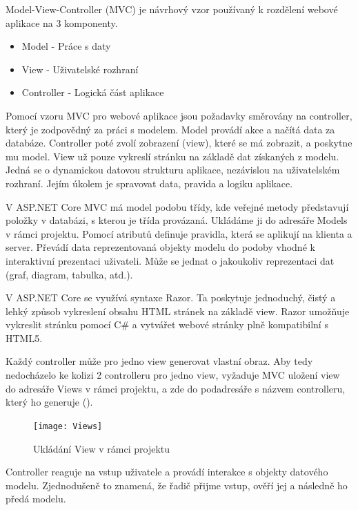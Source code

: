 \documentclass[a4paper, 12pt]{report}
\begin{document}
		Model-View-Controller (MVC) je návrhový vzor používaný k rozdělení webové aplikace na 3 komponenty.
		\begin{itemize}
			\item Model - Práce s daty
			\item View - Uživatelské rozhraní
			\item Controller - Logická část aplikace
		\end{itemize}\par
		Pomocí vzoru MVC pro webové aplikace jsou požadavky směrovány na controller, který je zodpovědný za práci s modelem. Model provádí akce a načítá data za databáze. Controller poté zvolí zobrazení (view), které se má zobrazit, a poskytne mu model. View už pouze vykreslí stránku na základě dat získaných z modelu.\cite{MVC}
				Jedná se o dynamickou datovou strukturu aplikace, nezávislou na uživatelském rozhraní. Jejím úkolem je spravovat data, pravida a logiku aplikace.\par
				V ASP.NET Core MVC má model podobu třídy, kde veřejné metody představují položky v databázi, s kterou je třída provázaná. Ukládáme ji do adresáře Models v rámci projektu. Pomocí atributů definuje pravidla, která se aplikují na klienta a server.\cite{MVC_Wiki_EN}
				Převádí data reprezentovaná objekty modelu do podoby vhodné k interaktivní prezentaci uživateli.\cite{MVC_Wiki_CZ} Může se jednat o jakoukoliv reprezentaci dat (graf, diagram, tabulka, atd.).\par
				V ASP.NET Core se využívá syntaxe Razor. Ta poskytuje jednoduchý, čistý a lehký způsob vykreslení obsahu HTML stránek na základě view. Razor umožňuje vykreslit stránku pomocí C\# a vytvářet webové stránky plně kompatibilní s HTML5.\cite{MVC_Wiki_EN}\par
				Každý controller může pro jedno view generovat vlastní obraz. Aby tedy nedocházelo ke kolizi 2 controlleru pro jedno view, vyžaduje  MVC uložení view do adresáře Views v rámci projektu, a zde do podadresáře s názvem controlleru, který ho generuje ().
				\begin{figure}[H]
					\centering
					\texttt{[image: Views]}
					\caption{Ukládání View v rámci projektu}
					\label{Views}
				\end{figure}
				Controller reaguje na vstup uživatele a provádí interakce s objekty datového modelu. Zjednodušeně to znamená, že řadič přijme vstup, ověří jej a následně ho předá modelu.\cite{MVC_Wiki_EN}\par
\end{document}
